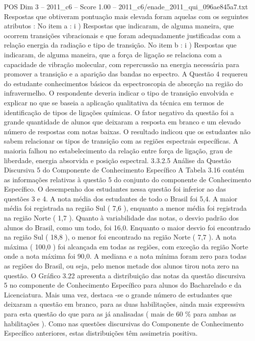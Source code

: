 \begin{textsample}{POS Dim 3 – 2011\_c6 – Score 1.00 – 2011\_c6/enade\_2011\_qui\_096ae845a7.txt}
Respostas que obtiveram pontuação mais elevada foram aquelas com os seguintes atributos : No item a : i ) Respostas que indicaram, de alguma maneira, que ocorrem transições vibracionais e que foram adequadamente justificadas com a relação energia da radiação e tipo de transição.
No item b : i ) Respostas que indicaram, de alguma maneira, que a força de ligação se relaciona com a capacidade de vibração molecular, com repercussão na energia necessária para promover a transição e a aparição das bandas no espectro.
A Questão 4 requereu do estudante conhecimentos básicos da espectroscopia de absorção na região do infravermelho.
O respondente deveria indicar o tipo de transição envolvida e explicar no que se baseia a aplicação qualitativa da técnica em termos de identificação de tipos de ligações químicas.
O fator negativo da questão foi a grande quantidade de alunos que deixaram a resposta em branco e um elevado número de respostas com notas baixas.
O resultado indicou que os estudantes não sabem relacionar os tipos de transição com as regiões espectrais específicas.
A maioria falhou no estabelecimento da relação entre força de ligação, grau de liberdade, energia absorvida e posição espectral. 3.3.2.5 Análise da Questão Discursiva 5 do Componente de Conhecimento Específico A Tabela 3.16 contém as informações relativas à questão 5 do conjunto do componente de Conhecimento Específico.
O desempenho dos estudantes nessa questão foi inferior ao das questões 3 e 4.
A nota média dos estudantes de todo o Brasil foi 5,4.
A maior média foi registrada na região Sul ( 7,6 ), enquanto a menor média foi registrada na região Norte ( 1,7 ).
Quanto à variabilidade das notas, o desvio padrão dos alunos do Brasil, como um todo, foi 16,0.
Enquanto o maior desvio foi encontrado na região Sul ( 18,8 ), o menor foi encontrado na região Norte ( 7,7 ).
A nota máxima ( 100,0 ) foi alcançada em todas as regiões, com exceção da região Norte onde a nota máxima foi 90,0.
A mediana e a nota mínima foram zero para todas as regiões do Brasil, ou seja, pelo menos metade dos alunos tirou nota zero na questão.
O Gráfico 3.22 apresenta a distribuição das notas da questão discursiva 5 no componente de Conhecimento Específico para alunos do Bacharelado e da Licenciatura.
Mais uma vez, destaca -se o grande número de estudantes que deixaram a questão em branco, para as duas habilitações, ainda mais expressiva para esta questão do que para as já analisadas ( mais de 60 \% para ambas as habilitações ).
Como nas questões discursivas do Componente de Conhecimento Específico anteriores, estas distribuições têm assimetria positiva.

\end{textsample}
